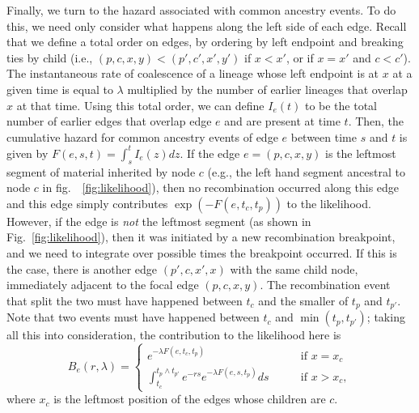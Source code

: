 \documentclass{article}
\begin{document}
Finally, we turn to the hazard associated with common ancestry events.
To do this,
we need only consider what happens along the left side of each edge.
Recall that we define a total order on edges,
by ordering by left endpoint and breaking ties by child
(i.e., $(p,c,x,y) < (p',c',x',y')$
if $x<x'$, or if $x=x'$ and $c<c'$).
The instantaneous rate of coalescence of a lineage whose left endpoint is at $x$
at a given time is equal to $\lambda$ multiplied
by the number of earlier lineages that overlap $x$ at that time.
Using this total order, we can define
$I_e(t)$ to be the total number of earlier edges that overlap edge $e$
and are present at time $t$.
Then, the cumulative hazard for common ancestry events of edge $e$
between time $s$ and $t$ is given by $F(e, s, t) = \int_{s}^{t} I_{e}(z) dz$.
If the edge $e = (p,c,x,y)$
is the leftmost segment of material inherited by node $c$
(e.g., the left hand segment ancestral to node $c$
in fig.\ ~\ref{fig:likelihood}),
then no recombination occurred along this edge and 
this edge simply contributes $\exp(-F(e,t_c,t_p))$ to the likelihood.
However, if the edge is \emph{not} the leftmost segment
(as shown in Fig.~\ref{fig:likelihood}),
then it was initiated by a new recombination breakpoint,
and we need to integrate over possible times the breakpoint occurred.
If this is the case, there is another edge $(p',c,x',x)$ with the same child node,
immediately adjacent to the focal edge $(p,c,x,y)$.
The recombination event that split the two must have happened between $t_c$
and the smaller of $t_p$ and $t_{p'}$. Note that two events must have happened
between $t_c$ and $\min(t_p, t_{p'})$; taking all this into consideration,
the contribution to the likelihood here is
\begin{equation}\label{eq:depth}
B_e(r, \lambda) = \begin{cases}
    e^{-\lambda F(e, t_c, t_p)}
        & \qquad \text{if } x=x_{c} \\
    \int_{t_c}^{t_{p} \wedge t_{p'}} e^{- r s} e^{-\lambda F(e, s, t_{p})} ds
        & \qquad \text{if } x>x_{c} ,
\end{cases}
\end{equation}
where $x_c$ is the leftmost position of the edges whose children are $c$.

\end{document}
